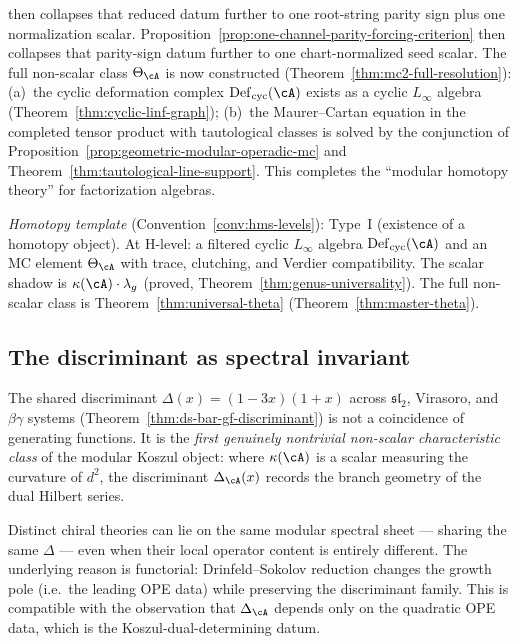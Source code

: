 \begin{remark}[Scope]
then collapses that reduced datum further to one root-string parity
sign plus one normalization scalar.
Proposition~\ref{prop:one-channel-parity-forcing-criterion}
then collapses that parity-sign datum further to one chart-normalized
seed scalar.
The full non-scalar class $\Theta_{\cA}$ is now constructed
(Theorem~\ref{thm:mc2-full-resolution}): (a)~the cyclic
deformation complex $\operatorname{Def}_{\mathrm{cyc}}(\cA)$
exists as a cyclic $L_\infty$ algebra
(Theorem~\ref{thm:cyclic-linf-graph}); (b)~the Maurer--Cartan
equation in the completed tensor product with tautological classes
is solved by the conjunction of
Proposition~\ref{prop:geometric-modular-operadic-mc} and
Theorem~\ref{thm:tautological-line-support}.
This completes the ``modular homotopy theory'' for
factorization algebras.

\emph{Homotopy template} (Convention~\ref{conv:hms-levels}): Type~I
(existence of a homotopy object).  At H-level: a filtered cyclic $L_\infty$
algebra $\operatorname{Def}_{\mathrm{cyc}}(\cA)$ and an MC element $\Theta_\cA$
with trace, clutching, and Verdier compatibility.  The scalar shadow is
$\kappa(\cA) \cdot \lambda_g$ (proved, Theorem~\ref{thm:genus-universality}).
The full non-scalar class is Theorem~\ref{thm:universal-theta}
(Theorem~\ref{thm:master-theta}).
\end{remark}

\subsection{The discriminant as spectral invariant}

The shared discriminant $\Delta(x) = (1 - 3x)(1+x)$ across
$\mathfrak{sl}_2$, Virasoro, and $\beta\gamma$ systems
(Theorem~\ref{thm:ds-bar-gf-discriminant}) is not a coincidence
of generating functions.  It is the \emph{first genuinely
nontrivial non-scalar characteristic class} of the modular Koszul
object: where $\kappa(\cA)$ is a scalar measuring the curvature
of $d^2$, the discriminant $\Delta_{\cA}(x)$ records the branch
geometry of the dual Hilbert series.

Distinct chiral theories can lie on the same modular spectral
sheet --- sharing the same $\Delta$ --- even when their local
operator content is entirely different.  The underlying reason
is functorial: Drinfeld--Sokolov reduction changes the growth pole
(i.e.\ the leading OPE data) while preserving the discriminant
family.  This is compatible with the observation that
$\Delta_{\cA}$ depends only on the quadratic OPE data, which is
the Koszul-dual-determining datum.

